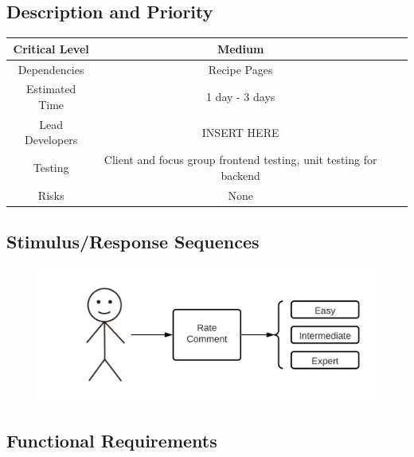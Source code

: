 \documentclass{scrreprt}
\begin{document}
\subsection{Description and Priority}
\begin{center}
    \begin{tabular}{| c | c | c | c |}
        \hline
        Critical Level  & Medium                                                            \\
        \hline
        Dependencies    & Recipe Pages                                                      \\
        \hline
        Estimated Time  & 1 day - 3 days                                                    \\
        \hline
        Lead Developers & INSERT HERE                                   \\
        \hline
        Testing         & Client and focus group \gls{frontend} testing,
                          \gls{unit testing} for \gls{backend}                                 \\
        \hline
        Risks           & None                                                              \\
        \hline
    \end{tabular}
\end{center}

\subsection{Stimulus/Response Sequences}

\begin{figure}[H]\centering
    \includegraphics[width=\columnwidth]{FlowCharts/Recipe-Difficulty.png}
\end{figure}

\subsection{\gls{Functional Requirements}}
\end{document}
